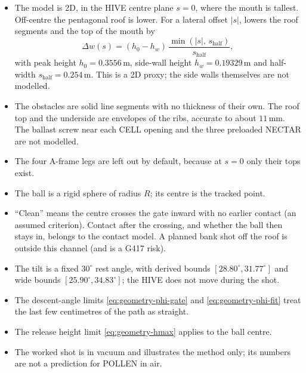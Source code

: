 \begin{itemize}
  \item The model is 2D, in the HIVE centre plane $s = 0$, where the mouth is tallest. Off-centre the
        pentagonal roof is lower. For a lateral offset $|s|$,  lowers the roof segments
        and the top of the mouth by
        \begin{equation}
          \Delta w(s) = (h_0 - h_w)\,\frac{\min(|s|,\, s_{\mathrm{half}})}{s_{\mathrm{half}}},
          \label{eq:geometry-roof-drop}
        \end{equation}
        with peak height $h_0 = 0.3556$\,\unit{m}\confirmed, side-wall height
        $h_w = 0.19329$\,\unit{m}\confirmed{} and half-width $s_{\mathrm{half}} = 0.254$\,\unit{m}\confirmed.
        This is a 2D proxy; the side walls themselves are not modelled.
  \item The obstacles are solid line segments with no thickness of their own. The roof top and the
        underside are envelopes of the ribs, accurate to about $11$\,\unit{mm}\derived. The ballast screw near
        each CELL opening and the three preloaded NECTAR are not modelled.
  \item The four A-frame legs are left out by default, because at $s = 0$ only their tops exist.
  \item The ball is a rigid sphere of radius $R$; its centre is the tracked point.
  \item ``Clean'' means the centre crosses the gate inward with no earlier contact (an assumed
        criterion). Contact after the crossing, and whether the ball then stays in, belongs to the contact
        model. A planned bank shot off the roof is outside this channel (and is a G417 risk).
  \item The tilt is a fixed $30^\circ$\confirmed{} rest angle, with derived bounds
        $[28.80^\circ, 31.77^\circ]$\derived{} and wide bounds $[25.90^\circ, 34.83^\circ]$\derived;
        the HIVE does not move during the shot.
  \item The descent-angle limits \eqref{eq:geometry-phi-gate} and \eqref{eq:geometry-phi-fit} treat the last few
        centimetres of the path as straight.
  \item The release height limit \eqref{eq:geometry-hmax} applies to the ball centre.
  \item The worked shot is in vacuum and illustrates the method only; its numbers are not a prediction
        for POLLEN in air.
\end{itemize}
